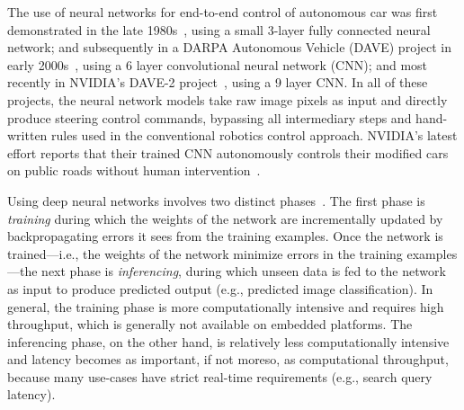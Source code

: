 The use of neural networks for end-to-end control of autonomous
car was first demonstrated in the late 1980s~\cite{Pomerleau1989},
using a small 3-layer fully connected neural network; and subsequently
in a DARPA Autonomous Vehicle (DAVE) project in early
2000s~\cite{LeCun:04}, using a 6 layer convolutional neural network
(CNN); and most recently in NVIDIA's DAVE-2
project~\cite{Bojarski2016}, using a 9 layer CNN. In all of these projects,
the neural network models take raw image pixels as input and directly
produce steering control commands, bypassing all intermediary steps and
hand-written rules used in the conventional robotics control approach.  
NVIDIA's latest effort reports that their trained CNN
autonomously controls their modified cars on public roads without human
intervention~\cite{Bojarski2016}.

Using deep neural networks involves two distinct
phases~\cite{NVIDIA2015}. The first
phase is \emph{training} during which the weights of the network are
incrementally updated by backpropagating errors it sees from the
training examples. Once the network is trained---i.e., the weights of
the network minimize errors in the training examples---the next phase
is \emph{inferencing}, during which unseen data is fed to the network
as input to produce predicted output (e.g., predicted image
classification). In general, the training phase is more computationally
intensive and requires high throughput, which is generally not
available on embedded platforms. The inferencing phase, on the
other hand, is relatively less computationally intensive and latency becomes
as important, if not moreso, as computational throughput, because many
use-cases have strict real-time requirements (e.g., search query
latency).





